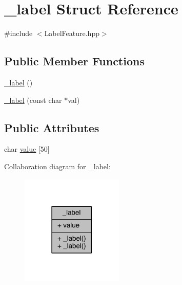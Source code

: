 \hypertarget{struct__label}{\section{\+\_\+label Struct Reference}
\label{struct__label}
}


{\ttfamily \#include $<$Label\+Feature.\+hpp$>$}

\subsection*{Public Member Functions}
\begin{DoxyCompactItemize}
\item 
\hyperlink{struct__label_ade65765434ea6e97ad4bdecf70dc2505}{\+\_\+label} ()
\item 
\hyperlink{struct__label_afe885787cc58bb203aa2e0c1a1e9770b}{\+\_\+label} (const char $\ast$val)
\end{DoxyCompactItemize}
\subsection*{Public Attributes}
\begin{DoxyCompactItemize}
\item 
char \hyperlink{struct__label_aa7154ad6c9bb58841aefe2a29bcaa940}{value} \mbox{[}50\mbox{]}
\end{DoxyCompactItemize}


Collaboration diagram for \+\_\+label\+:\nopagebreak
\begin{figure}[H]
\begin{center}
\leavevmode
\includegraphics[width=138pt]{struct__label__coll__graph}
\end{center}
\end{figure}



